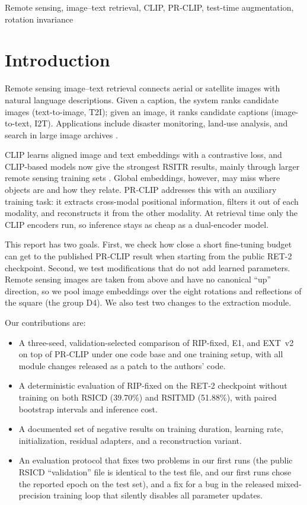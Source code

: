 \documentclass[conference]{IEEEtran}
\begin{document}
\begin{IEEEkeywords}
Remote sensing, image--text retrieval, CLIP, PR-CLIP, test-time augmentation, rotation invariance
\end{IEEEkeywords}

\section{Introduction}
Remote sensing image--text retrieval connects aerial or satellite images with natural language descriptions. Given a caption, the system ranks candidate images (text-to-image, T2I); given an image, it ranks candidate captions (image-to-text, I2T). Applications include disaster monitoring, land-use analysis, and search in large image archives \cite{yuan2022amfmn,yuan2022galr}.

CLIP \cite{radford2021clip} learns aligned image and text embeddings with a contrastive loss, and CLIP-based models now give the strongest RSITR results, mainly through larger remote sensing training sets \cite{liu2024remoteclip,zhang2024georsclip,wang2024skyclip}. Global embeddings, however, may miss where objects are and how they relate. PR-CLIP \cite{guan2025prclip} addresses this with an auxiliary training task: it extracts cross-modal positional information, filters it out of each modality, and reconstructs it from the other modality. At retrieval time only the CLIP encoders run, so inference stays as cheap as a dual-encoder model.

This report has two goals. First, we check how close a short fine-tuning budget can get to the published PR-CLIP result when starting from the public RET-2 checkpoint. Second, we test modifications that do not add learned parameters. Remote sensing images are taken from above and have no canonical ``up'' direction, so we pool image embeddings over the eight rotations and reflections of the square (the group D4). We also test two changes to the extraction module.

Our contributions are:
\begin{itemize}
\item A three-seed, validation-selected comparison of RIP-fixed, E1, and EXT~v2 on top of PR-CLIP under one code base and one training setup, with all module changes released as a patch to the authors' code.
\item A deterministic evaluation of RIP-fixed on the RET-2 checkpoint without training on both RSICD (39.70\%) and RSITMD (51.88\%), with paired bootstrap intervals and inference cost.
\item A documented set of negative results on training duration, learning rate, initialization, residual adapters, and a reconstruction variant.
\item An evaluation protocol that fixes two problems in our first runs (the public RSICD ``validation'' file is identical to the test file, and our first runs chose the reported epoch on the test set), and a fix for a bug in the released mixed-precision training loop that silently disables all parameter updates.
\end{itemize}
\end{document}
